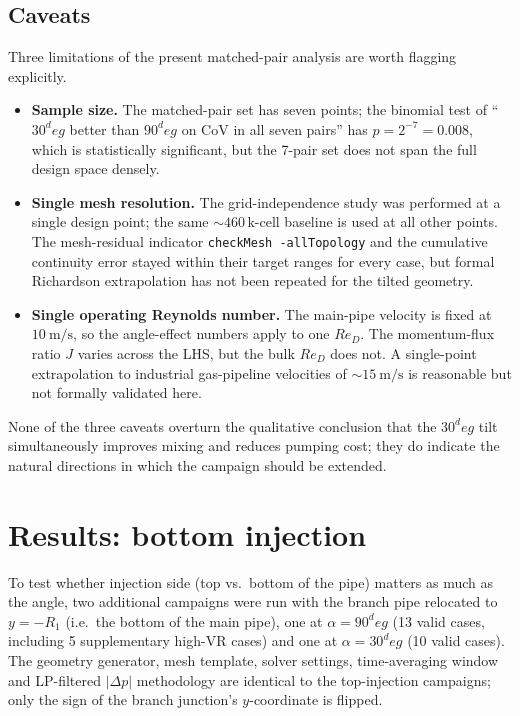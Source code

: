 \documentclass[11pt,a4paper]{article}
\def\VR{VR}%
\def\CoV{CoV}%
\def\circ{ deg}%
\newcommand{\VR}{\ensuremath{\mathrm{VR}}}
\newcommand{\CoV}{\ensuremath{\mathrm{CoV}}}
\begin{document}
\subsection{Caveats}
\label{sec:cross_caveats}
Three limitations of the present matched-pair analysis are worth
flagging explicitly.
\begin{itemize}
    \item \textbf{Sample size.} The matched-pair set has seven
    points; the binomial test of ``\(30^\circ\) better than
    \(90^\circ\) on \CoV{} in all seven pairs'' has
    \(p=2^{-7}=0.008\), which is statistically significant, but the
    7-pair set does not span the full design space densely.
    \item \textbf{Single mesh resolution.} The grid-independence
    study was performed at a single design point; the same
    \(\sim 460\,\mathrm{k}\)-cell baseline is used at all other
    points. The mesh-residual indicator
    \texttt{checkMesh -allTopology} and the cumulative continuity
    error stayed within their target ranges for every case, but
    formal Richardson extrapolation has not been repeated for the
    tilted geometry.
    \item \textbf{Single operating Reynolds number.}\;
    The main-pipe velocity is fixed at
    \(\SI{10}{\meter\per\second}\), so the angle-effect numbers
    apply to one \(Re_D\). The momentum-flux ratio \(J\) varies
    across the LHS, but the bulk \(Re_D\) does not. A single-point
    extrapolation to industrial gas-pipeline velocities of
    \(\sim\SI{15}{\meter\per\second}\) is reasonable but not
    formally validated here.
\end{itemize}
None of the three caveats overturn the qualitative conclusion that
the \(30^\circ\) tilt simultaneously improves mixing and reduces
pumping cost; they do indicate the natural directions in which the
campaign should be extended.

\section{Results: bottom injection}
\label{sec:bottom}

To test whether injection side (top vs.\ bottom of the pipe) matters
as much as the angle, two additional campaigns were run with the
branch pipe relocated to \(y = -R_1\) (i.e.\ the bottom of the
main pipe), one at \(\alpha = 90^\circ\) (13 valid cases, including
5 supplementary high-\VR{} cases) and one at \(\alpha = 30^\circ\)
(10 valid cases). The geometry generator, mesh template, solver
settings, time-averaging window and LP-filtered \(|\Delta p|\)
methodology are identical to the top-injection campaigns; only the
sign of the branch junction's \(y\)-coordinate is flipped.
\end{document}
